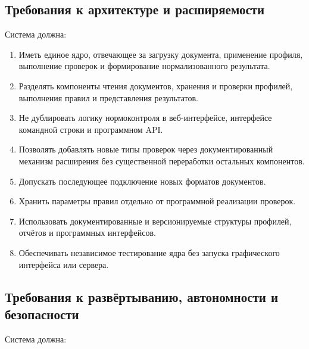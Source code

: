 \documentclass[a4paper,14pt]{extarticle}
\begin{document}
\subsection{Требования к архитектуре и расширяемости}

Система должна:

\begin{enumerate}
    \item Иметь единое ядро, отвечающее за загрузку документа, применение профиля, выполнение проверок и формирование нормализованного результата.

    \item Разделять компоненты чтения документов, хранения и проверки профилей, выполнения правил и представления результатов.

    \item Не дублировать логику нормоконтроля в веб-интерфейсе, интерфейсе командной строки и программном API.

    \item Позволять добавлять новые типы проверок через документированный механизм расширения без существенной переработки остальных компонентов.

    \item Допускать последующее подключение новых форматов документов.

    \item Хранить параметры правил отдельно от программной реализации проверок.

    \item Использовать документированные и версионируемые структуры профилей, отчётов и программных интерфейсов.

    \item Обеспечивать независимое тестирование ядра без запуска графического интерфейса или сервера.
\end{enumerate}

\subsection{Требования к развёртыванию, автономности и безопасности}

Система должна:
\end{document}
